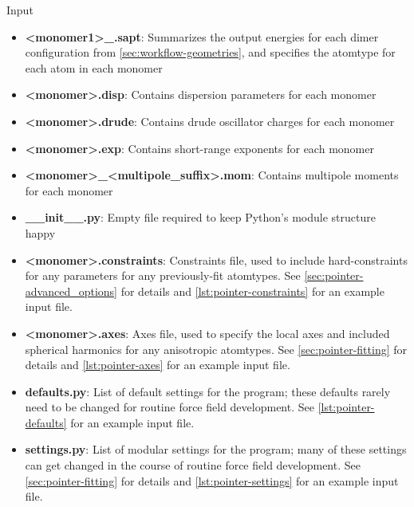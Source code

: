 \begin{subsection}{Input}
\begin{itemize}
\item \textbf{<monomer1>\_<monomer2>.sapt}:
Summarizes the output \sapt energies for each dimer configuration from
\cref{sec:workflow-geometries}, and specifies the atomtype for each atom in
each monomer 
\item \textbf{<monomer>.disp}:
Contains dispersion parameters for each monomer
\item \textbf{<monomer>.drude}:
Contains drude oscillator charges for each monomer
\item \textbf{<monomer>.exp}:
Contains short-range exponents for each monomer
\item \textbf{<monomer>\_<multipole\_suffix>.mom}:
Contains multipole moments for each monomer
\item \textbf{\_\_init\_\_.py}:
Empty file required to keep Python's module structure happy
\item \textcolor{codegreen}{\textbf{<monomer>.constraints}:}
Constraints file, used to include hard-constraints for any \A parameters
for any previously-fit atomtypes. See \cref{sec:pointer-advanced_options} for
details and \cref{lst:pointer-constraints} for an example input file.
\item \textcolor{codegreen}{\textbf{<monomer>.axes}:}
Axes file, used to specify the local axes and included spherical harmonics for
any anisotropic atomtypes. See \cref{sec:pointer-fitting} for details and
\cref{lst:pointer-axes} for an example input file.
\item \textcolor{codegreen}{\textbf{defaults.py}:}
List of default settings for the \pointer program; these defaults rarely need
to be changed for routine force field development. 
See \cref{lst:pointer-defaults} for an example input file.
\item \textcolor{codepurple}{\textbf{settings.py}:}
List of modular settings for the \pointer program; many of these settings can
get changed in the course of routine force field development. See
\cref{sec:pointer-fitting} for details and \cref{lst:pointer-settings} for
an example input file.
\end{itemize}

\end{subsection}

